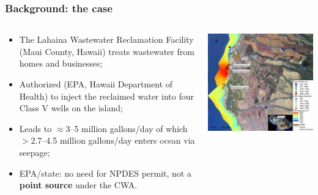 \documentclass[aspectratio=169]{beamer}
\theoremstyle{principle}
\begin{document}
\begin{frame}
\frametitle{Background: the case}
\begin{columns}

\begin{column}{0.5\textwidth}
\begin{itemize}

\item The Lahaina Wastewater Reclamation Facility (Maui County, Hawaii) treats wastewater from homes and businesses;
\bigskip
\item Authorized (EPA, Hawaii Department of Health) to inject the reclaimed water into four Class V wells on the island;
\bigskip
\item Leads to $\approx$3--5 million gallons/day of which $>$2.7--4.5 million gallons/day enters ocean via seepage;
\bigskip
\item EPA/state: no need for NPDES permit, not a \textbf{point source} under the CWA. 
\end{itemize}
\end{column}

%

\begin{column}{0.5\textwidth}  %
    \begin{center}
     \includegraphics[scale=0.6]{a-tracer-dye.jpg}
     \end{center}
\end{column}

\end{columns}

\end{frame}
\end{document}
